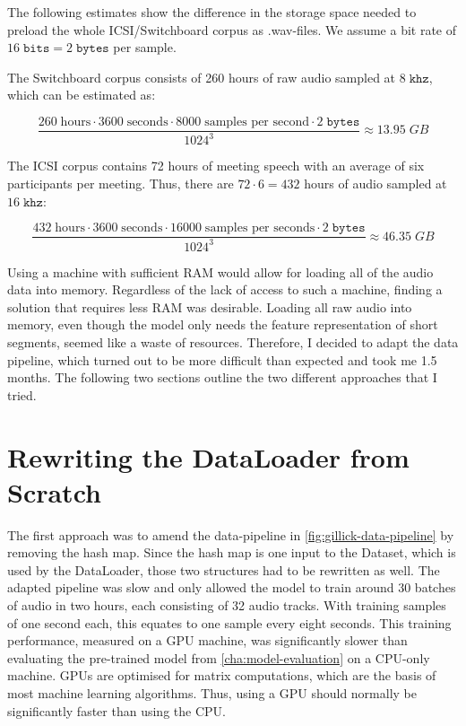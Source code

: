 \documentclass[bsc,frontabs,parskip,deptreport]{infthesis}
\begin{document}
The following estimates show the difference in the storage space needed to preload the whole ICSI/Switchboard corpus as .wav-files. We assume a bit rate of $16\;\mathtt{bits}=2\;\mathtt{bytes}$ per sample.

The Switchboard corpus consists of 260 hours of raw audio sampled at $8\;\mathtt{khz}$, which can be estimated as:

$$ \frac{260\;\textrm{hours} \cdot 3600\;\textrm{seconds} \cdot 8000\;\textrm{samples per second} \cdot 2\;\mathtt{bytes}}{1024^3} \approx 13.95 \mathtt\;{GB} $$  

The ICSI corpus contains 72 hours of meeting speech with an average of six participants per meeting. Thus, there are $72 \cdot 6=432$ hours of audio sampled at $16\;\mathtt{khz}$:

$$ \frac{432\;\textrm{hours} \cdot 3600\;\textrm{seconds} \cdot 16000 \;\textrm{samples per seconds} \cdot 2\;\mathtt{bytes}}{1024^3} \approx 46.35 \mathtt\;{GB} $$

Using a machine with sufficient RAM would allow for loading all of the audio data into memory. 
Regardless of the lack of access to such a machine, finding a solution that requires less RAM was desirable. Loading all raw audio into memory, even though the model only needs the feature representation of short segments, seemed like a waste of resources. Therefore, I decided to adapt the data pipeline, which turned out to be more difficult than expected and took me 1.5 months. The following two sections outline the two different approaches that I tried. 

\section{Rewriting the DataLoader from Scratch} \label{sec:first-data-pipeline}

The first approach was to amend the data-pipeline in \autoref{fig:gillick-data-pipeline} by removing the hash map. Since the hash map is one input to the Dataset, which is used by the DataLoader, those two structures had to be rewritten as well. 
The adapted pipeline was slow and only allowed the model to train around 30 batches of audio in two hours, each consisting of 32 audio tracks. 
With training samples of one second each, this equates to one sample every eight seconds.
This training performance, measured on a GPU machine, was significantly slower than evaluating the pre-trained model from \autoref{cha:model-evaluation} on a CPU-only machine. 
GPUs are optimised for matrix computations, which are the basis of most machine learning algorithms. Thus, using a GPU should normally be significantly faster than using the CPU.
\end{document}
